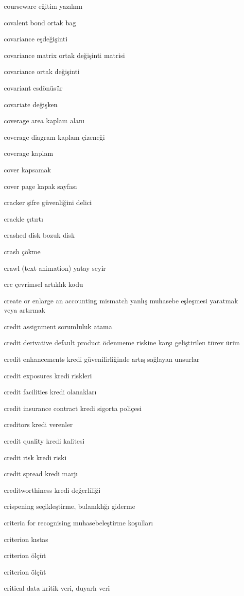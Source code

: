 \documentclass[12pt,fleqn]{article}\usepackage{../../common}
\begin{document}
courseware eğitim yazılımı

covalent bond ortak bag

covariance eşdeğişinti

covariance matrix ortak değişinti matrisi

covariance ortak değişinti

covariant esdönüsür

covariate değişken

coverage area kaplam alanı

coverage diagram kaplam çizeneği

coverage kaplam

cover kapsamak

cover page kapak sayfası

cracker şifre güvenliğini delici

crackle çıtırtı

crashed disk bozuk disk

crash çökme

crawl (text animation) yatay seyir

crc çevrimsel artıklık kodu

create or enlarge an accounting mismatch yanlış muhasebe eşleşmesi yaratmak veya artırmak

credit assignment sorumluluk atama

credit derivative default product ödenmeme riskine karşı geliştirilen türev ürün

credit enhancements kredi güvenilirliğinde artış sağlayan unsurlar

credit exposures kredi riskleri

credit facilities kredi olanakları

credit insurance contract kredi sigorta poliçesi

creditors kredi verenler

credit quality kredi kalitesi

credit risk kredi riski

credit spread kredi marjı

creditworthiness kredi değerliliği

crispening seçikleştirme, bulanıklığı giderme

criteria for recognising muhasebeleştirme koşulları

criterion kıstas

criterion ölçüt

criterion ölçüt

critical data kritik veri, duyarlı veri
\end{document}
